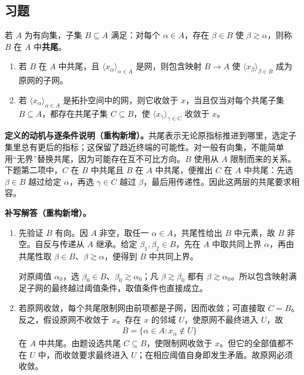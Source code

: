 \documentclass[../../main.tex]{subfiles}%
\begin{document}
\subsection*{习题}
\begin{exercise}\label{exercise:ch04-cofinal}
\begin{definition*}[共尾子集]\label{definition:ch04-cofinal}
若 $A$ 为有向集，子集 $B\subseteq A$ 满足：对每个 $\alpha\in A$，存在 $\beta\in B$ 使 $\beta\gtrsim\alpha$，则称 $B$ 在 $A$ 中\textbf{共尾}。
\end{definition*}
\begin{enumerate}
\item\label{item:ch04-cofinal-subnet} 若 $B$ 在 $A$ 中共尾，且 $\langle x_\alpha\rangle_{\alpha\in A}$ 是网，则包含映射 $B\to A$ 使 $\langle x_\beta\rangle_{\beta\in B}$ 成为原网的子网。
\item\label{item:ch04-cofinal-convergence} 若 $\langle x_\alpha\rangle_{\alpha\in A}$ 是拓扑空间中的网，则它收敛于 $x$，当且仅当对每个共尾子集 $B\subseteq A$，都存在共尾子集 $C\subseteq B$，使 $\langle x_\gamma\rangle_{\gamma\in C}$ 收敛于 $x$。
\end{enumerate}
\end{exercise}
\begin{remark}
\textbf{定义的动机与逐条件说明（重构新增）。}共尾表示无论原指标推进到哪里，选定子集里总有更后的指标；这保留了趋近终端的可能性。对一般有向集，不能简单用“无界”替换共尾，因为可能存在互不可比方向。$B$ 使用从 $A$ 限制而来的关系。下题第二项中，$C$ 在 $B$ 中共尾且 $B$ 在 $A$ 中共尾，便推出 $C$ 在 $A$ 中共尾：先选 $\beta\in B$ 越过给定 $\alpha$，再选 $\gamma\in C$ 越过 $\beta$，最后用传递性。因此这两层的共尾要求相容。
\end{remark}
\begin{solution}
\textbf{补写解答（重构新增）。}
\begin{enumerate}
\item 先验证 $B$ 有向。因 $A$ 非空，取任一 $\alpha\in A$，共尾性给出 $B$ 中元素，故 $B$ 非空。自反与传递从 $A$ 继承。给定 $\beta_1,\beta_2\in B$，先在 $A$ 中取共同上界 $\alpha$，再由共尾性取 $\beta\in B$、$\beta\gtrsim\alpha$，便得到 $B$ 中共同上界。

对原阈值 $\alpha_0$，选 $\beta_0\in B$、$\beta_0\gtrsim\alpha_0$；凡 $\beta\gtrsim\beta_0$ 都有 $\beta\gtrsim\alpha_0$。所以包含映射满足子网的最终越过阈值条件，取值条件也直接成立。
\item 若原网收敛，每个共尾限制网由前项都是子网，因而收敛；可直接取 $C=B$。反之，假设原网不收敛于 $x$。存在 $x$ 的邻域 $U$，使原网不最终进入 $U$，故
\begin{align*}
B=\{\alpha\in A:x_\alpha\notin U\}
\end{align*}
在 $A$ 中共尾。由题设选共尾 $C\subseteq B$，使限制网收敛于 $x$。但它的全部值都不在 $U$ 中，而收敛要求最终进入 $U$；在相应阈值自身即发生矛盾。故原网必须收敛。
\end{enumerate}
\end{solution}
\end{document}
